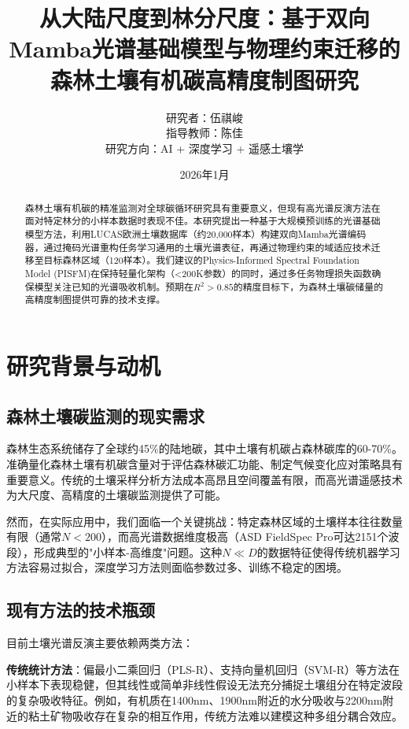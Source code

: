 \documentclass[12pt, a4paper]{article}
\title{\textbf{从大陆尺度到林分尺度：基于双向Mamba光谱基础模型与物理约束迁移的森林土壤有机碳高精度制图研究}}
\author{研究者：伍祺峻 \\ 指导教师：陈佳 \\ 研究方向：AI + 深度学习 + 遥感土壤学}
\date{2026年1月}
\begin{document}
\maketitle

\begin{abstract}
森林土壤有机碳的精准监测对全球碳循环研究具有重要意义，但现有高光谱反演方法在面对特定林分的小样本数据时表现不佳。本研究提出一种基于大规模预训练的光谱基础模型方法，利用LUCAS欧洲土壤数据库（约20,000样本）构建双向Mamba光谱编码器，通过掩码光谱重构任务学习通用的土壤光谱表征，再通过物理约束的域适应技术迁移至目标森林区域（120样本）。我们建议的Physics-Informed Spectral Foundation Model (PISFM)在保持轻量化架构（<200K参数）的同时，通过多任务物理损失函数确保模型关注已知的光谱吸收机制。预期在$R^2 > 0.85$的精度目标下，为森林土壤碳储量的高精度制图提供可靠的技术支撑。
\end{abstract}

\newpage
\tableofcontents
\newpage

\section{研究背景与动机}

\subsection{森林土壤碳监测的现实需求}
森林生态系统储存了全球约45\%的陆地碳，其中土壤有机碳占森林碳库的60-70\%。准确量化森林土壤有机碳含量对于评估森林碳汇功能、制定气候变化应对策略具有重要意义。传统的土壤采样分析方法成本高昂且空间覆盖有限，而高光谱遥感技术为大尺度、高精度的土壤碳监测提供了可能。

然而，在实际应用中，我们面临一个关键挑战：特定森林区域的土壤样本往往数量有限（通常$N < 200$），而高光谱数据维度极高（ASD FieldSpec Pro可达2151个波段），形成典型的"小样本-高维度"问题。这种$N \ll D$的数据特征使得传统机器学习方法容易过拟合，深度学习方法则面临参数过多、训练不稳定的困境。

\subsection{现有方法的技术瓶颈}
目前土壤光谱反演主要依赖两类方法：

\textbf{传统统计方法}：偏最小二乘回归（PLS-R）、支持向量机回归（SVM-R）等方法在小样本下表现稳健，但其线性或简单非线性假设无法充分捕捉土壤组分在特定波段的复杂吸收特征。例如，有机质在1400nm、1900nm附近的水分吸收与2200nm附近的粘土矿物吸收存在复杂的相互作用，传统方法难以建模这种多组分耦合效应。
\end{document}
